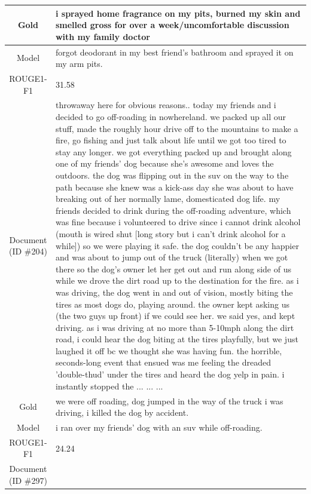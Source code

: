 \begin{table}[bth!]
\begin{tabular}{c|p{}}
\\ \hline
Gold & 
i sprayed home fragrance on my pits, burned my skin and smelled gross for over a week/uncomfortable discussion with my family doctor
\\ \hline
Model & 
forgot deodorant in my best friend's bathroom and sprayed it on my arm pits.
\\ \hline
ROUGE1-F1 & 
31.58
\\ \hline
\makecell{Document\\(ID \#204)} & 
throwaway here for obvious reasons.. today my friends and i decided to go off-roading in nowhereland. we packed up all our stuff, made the roughly hour drive off to the mountains to make a fire, go fishing and just talk about life until we got too tired to stay any longer. we got everything packed up and brought along one of my friends' dog because she's awesome and loves the outdoors. the dog was flipping out in the suv on the way to the path because she knew was a kick-ass day she was about to have breaking out of her normally lame, domesticated dog life. my friends decided to drink during the off-roading adventure, which was fine because i volunteered to drive since i cannot drink alcohol (mouth is wired shut [long story but i can't drink alcohol for a while]) so we were playing it safe. the dog couldn't be any happier and was about to jump out of the truck (literally) when we got there so the dog's owner let her get out and run along side of us while we drove the dirt road up to the destination for the fire. as i was driving, the dog went in and out of vision, mostly biting the tires as most dogs do, playing around. the owner kept asking us (the two guys up front) if we could see her. we said yes, and kept driving. as i was driving at no more than 5-10mph along the dirt road, i could hear the dog biting at the tires playfully, but we just laughed it off bc we thought she was having fun. the horrible, seconds-long event that ensued was me feeling the dreaded 'double-thud' under the tires and heard the dog yelp in pain. i instantly stopped the ... ... ... 
\\ \hline
Gold & 
we were off roading, dog jumped in the way of the truck i was driving, i killed the dog by accident.
\\ \hline
Model & 
i ran over my friends' dog with an suv while off-roading.
\\ \hline
ROUGE1-F1 & 
24.24
\\ \hline
\makecell{Document\\(ID \#297)} & 

\end{tabular}
\end{table}
